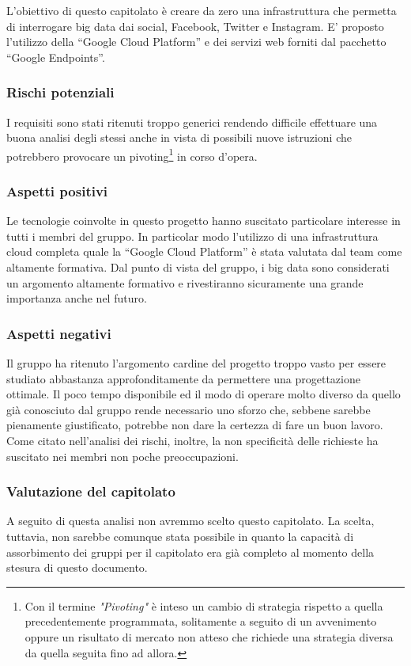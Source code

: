 L’obiettivo di questo capitolato è creare da zero una infrastruttura che permetta di interrogare big data dai social, Facebook, Twitter e Instagram.
E’ proposto l’utilizzo della “Google Cloud Platform” e dei servizi web forniti dal pacchetto “Google Endpoints”. 

\subsubsection{Rischi potenziali}
I requisiti sono stati ritenuti troppo generici  rendendo difficile effettuare una buona analisi degli stessi anche in vista di possibili nuove istruzioni che potrebbero provocare un pivoting\footnote{Con il termine \textit{"Pivoting"} è inteso un cambio di strategia rispetto a quella precedentemente programmata, solitamente a seguito di un avvenimento oppure un risultato di mercato non atteso che richiede una strategia diversa da quella seguita fino ad allora.} in corso d’opera.

\subsubsection{Aspetti positivi}
Le tecnologie coinvolte in questo progetto hanno suscitato particolare interesse in tutti i membri del gruppo. In particolar modo l’utilizzo di una infrastruttura cloud completa quale la “Google Cloud Platform” è stata valutata dal team come altamente formativa. Dal punto di vista del gruppo, i big data sono considerati un argomento altamente formativo e rivestiranno sicuramente una grande importanza anche nel futuro.

\subsubsection{Aspetti negativi}
Il gruppo ha ritenuto l’argomento cardine del progetto troppo vasto per essere studiato abbastanza approfonditamente da permettere una progettazione ottimale. Il poco tempo disponibile ed il modo di operare molto diverso da quello già conosciuto dal gruppo rende necessario uno sforzo che, sebbene
sarebbe pienamente giustificato, potrebbe non dare la certezza di fare un buon lavoro.\\
Come citato nell’analisi dei rischi, inoltre, la non specificità delle richieste  ha suscitato nei membri non poche preoccupazioni.


\subsubsection{Valutazione del capitolato} 

A seguito di questa analisi non avremmo scelto questo capitolato. La scelta, tuttavia, non sarebbe comunque stata possibile in quanto la capacità di assorbimento dei gruppi per il capitolato era già completo al momento della stesura di questo documento.
